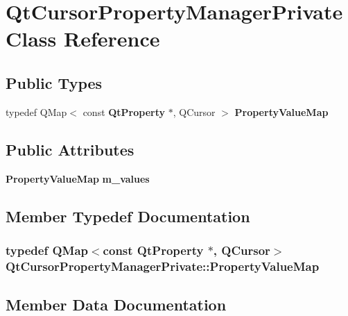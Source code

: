 \section{Qt\+Cursor\+Property\+Manager\+Private Class Reference}
\label{classQtCursorPropertyManagerPrivate}
\subsection*{Public Types}
\begin{DoxyCompactItemize}
\item 
typedef Q\+Map$<$ const {\bf Qt\+Property} $\ast$, Q\+Cursor $>$ {\bf Property\+Value\+Map}
\end{DoxyCompactItemize}
\subsection*{Public Attributes}
\begin{DoxyCompactItemize}
\item 
{\bf Property\+Value\+Map} {\bf m\+\_\+values}
\end{DoxyCompactItemize}


\subsection{Member Typedef Documentation}
\subsubsection[{Property\+Value\+Map}]{\setlength{\rightskip}{0pt plus 5cm}typedef Q\+Map$<$const {\bf Qt\+Property} $\ast$, Q\+Cursor$>$ {\bf Qt\+Cursor\+Property\+Manager\+Private\+::\+Property\+Value\+Map}}\label{classQtCursorPropertyManagerPrivate_ac2f1753608b187871aa0c34f329fcd21}


\subsection{Member Data Documentation}
